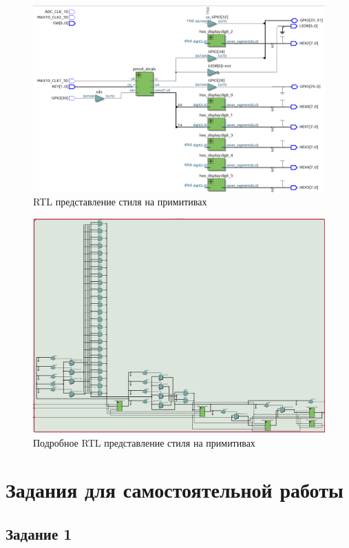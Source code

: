 \documentclass[a4paper,14pt]{article}
\begin{document}
	\begin{figure}[H]
		\centering
		\includegraphics[width=0.9\linewidth]{images/9_4_rtl}
		\caption{RTL представление стиля на примитивах}
		\label{fig:9_4_rtl}
	\end{figure}
	
	\begin{figure}[H]
		\centering
		\includegraphics[width=0.9\linewidth]{images/9_4_rtl2}
		\caption{Подробное RTL представление стиля на примитивах}
		\label{fig:9_4_rtl2}
	\end{figure}

	
	\section{Задания для самостоятельной работы}

	\subsection{Задание 1}
\end{document}
